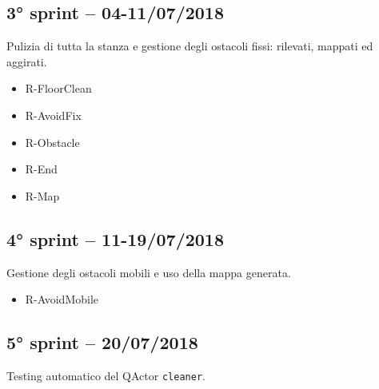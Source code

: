 \subsection{3° sprint -- 04-11/07/2018}
Pulizia di tutta la stanza e gestione degli ostacoli fissi: rilevati, mappati ed aggirati.

\begin{itemize}
	\ttfamily
	\item R-FloorClean
	\item R-AvoidFix
	\item R-Obstacle
	\item R-End
	\item R-Map
\end{itemize}

\subsection{4° sprint -- 11-19/07/2018}
Gestione degli ostacoli mobili e uso della mappa generata.

\begin{itemize}
	\ttfamily
	\item R-AvoidMobile
\end{itemize}

\subsection{5° sprint -- 20/07/2018}
Testing automatico del QActor \texttt{cleaner}.


